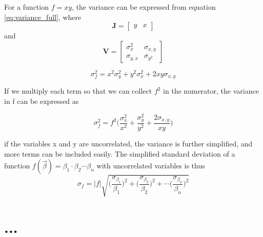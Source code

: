 \documentclass[a4paper,11pt,twoside]{book}
\begin{document}
\noindent 
For a function $f=xy $, the variance can be expressed from equation \ref{eq:variance_full}, where  $$\mathbf{J}=\begin{bmatrix}y & x \end{bmatrix}$$ and $$\mathbf{V}=\begin{bmatrix} \sigma_x^2 & \sigma_{x,y}\\\sigma_{y,x} & \sigma_{y^2} \end{bmatrix}$$ 

\begin{equation}
    \sigma_f^2 = x^2\sigma_y^2 + y^2\sigma_x^2 + 2 xy \sigma_{x,y}
\end{equation}

\noindent If we multiply each term so that we can collect $f^2$ in the numerator, the variance in f can be expressed as 

\begin{equation}
    \sigma_f^2 = f^2 \big( \frac{\sigma_x^2}{x^2} + \frac{\sigma_y^2}{y^2} + \frac{2\sigma_{x,y}}{xy} \Big)
\end{equation}

\noindent if the variables x and y are uncorrelated, the variance is further simplified, and more terms can be included easily. The simplified standard deviation of a function $f(\vec{\beta})=\beta_1 \cdot \beta_2 \cdots \beta_n $ with uncorrelated variables is thus
\begin{equation} \label{eq:uncertainty_simplification}
    \sigma_f = |f|\sqrt{ \Big( \frac{\sigma_{\beta_1}}{\beta_1}\Big)^2 +  \Big( \frac{\sigma_{\beta_2}}{\beta_2}\Big)^2 + \cdots  \Big( \frac{\sigma_{\beta_n}}{\beta_n}\Big)^2    } 
\end{equation}



\chapter{...}


%
%
%
%
%
%

%
%



%
%
%
%

%
\end{document}
